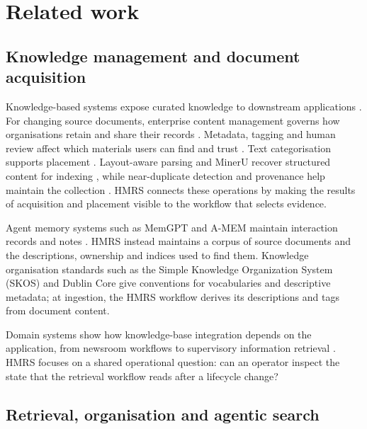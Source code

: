 \section{Related work}
\label{sec:related}

\subsection{Knowledge management and document acquisition}

Knowledge-based systems expose curated knowledge to downstream
applications \citep{yang-kbs-llm-2025,auer-dbpedia-kb-2007}. For changing
source documents, enterprise content management governs how organisations
retain and share their records
\citep{paivarinta-ecm-2005,tyrvaainen-ecm-2006}. Metadata, tagging and human
review affect which materials users can find and trust \citep{park-metadata-quality-2009,golder-tagging-2006,mosqueira-rey-hitl-2022}.
Text categorisation supports placement \citep{sebastiani2002machine}.
Layout-aware parsing and MinerU recover structured content for indexing
\citep{zhong-publaynet-layout-2019,huang-layoutlmv3-docai-2022,mineru}, while
near-duplicate detection and provenance help maintain the collection
\citep{manku-near-dup-2007,missier-prov-2013,cheney-provenance-2009}.
HMRS connects these operations by making the results of acquisition and
placement visible to the workflow that selects evidence.

Agent memory systems such as MemGPT and A-MEM maintain interaction
records and notes \citep{memgpt,amem}. HMRS instead maintains a corpus of
source documents and the descriptions, ownership and indices used to find
them. Knowledge organisation standards such as the Simple Knowledge
Organization System (SKOS) \citep{skos} and
Dublin Core \citep{dcmi-terms} give conventions for vocabularies and
descriptive metadata; at ingestion, the HMRS workflow derives its
descriptions and tags from document content.

Domain systems show how knowledge-base integration depends on the application,
from newsroom workflows to supervisory information retrieval
\citep{ocaa2023software,aarab2024system}. HMRS focuses on a shared operational
question: can an operator inspect the state that the retrieval workflow
reads after a lifecycle change?

\subsection{Retrieval, organisation and agentic search}

